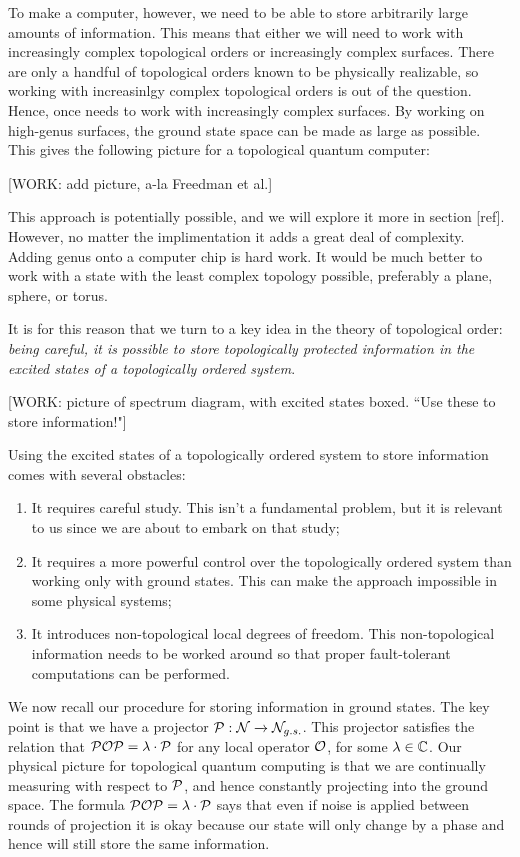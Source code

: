 To make a computer, however, we need to be able to store arbitrarily large amounts of information. This means that either we will need to work with increasingly complex topological orders or increasingly complex surfaces. There are only a handful of topological orders known to be physically realizable, so working with increasinlgy complex topological orders is out of the question. Hence, once needs to work with increasingly complex surfaces. By working on high-genus surfaces, the ground state space can be made as large as possible. This gives the following picture for a topological quantum computer:

[WORK: add picture, a-la Freedman et al.]

This approach is potentially possible, and we will explore it more in section [ref]. However, no matter the implimentation it adds a great deal of complexity. Adding genus onto a computer chip is hard work. It would be much better to work with a state with the least complex topology possible, preferably a plane, sphere, or torus.

It is for this reason that we turn to a key idea in the theory of topological order: \textit{being careful, it is possible to store topologically protected information in the excited states of a topologically ordered system}.

[WORK: picture of spectrum diagram, with excited states boxed. ``Use these to store information!"]

Using the excited states of a topologically ordered system to store information comes with several obstacles:

\begin{enumerate}
\item It requires careful study. This isn't a fundamental problem, but it is relevant to us since we are about to embark on that study;
\item It requires a more powerful control over the topologically ordered system than working only with ground states. This can make the approach impossible in some physical systems;
\item It introduces non-topological local degrees of freedom. This non-topological information needs to be worked around so that proper fault-tolerant computations can be performed.
\end{enumerate}

We now recall our procedure for storing information in ground states. The key point is that we have a projector $\mathcal{P}:\mathcal{N}\xrightarrow{}\mathcal{N}_{g.s.}$. This projector satisfies the relation that $\mathcal{P} \mathcal{O} \mathcal{P} = \lambda\cdot \mathcal{P}$ for any local operator $\mathcal{O}$, for some $\lambda\in \mathbb{C}$. Our physical picture for topological quantum computing is that we are continually measuring with respect to $\mathcal{P}$, and hence constantly projecting into the ground space. The formula $\mathcal{P} \mathcal{O} \mathcal{P} = \lambda \cdot \mathcal{P}$ says that even if noise is applied between rounds of projection it is okay because our state will only change by a phase and hence will still store the same information.

